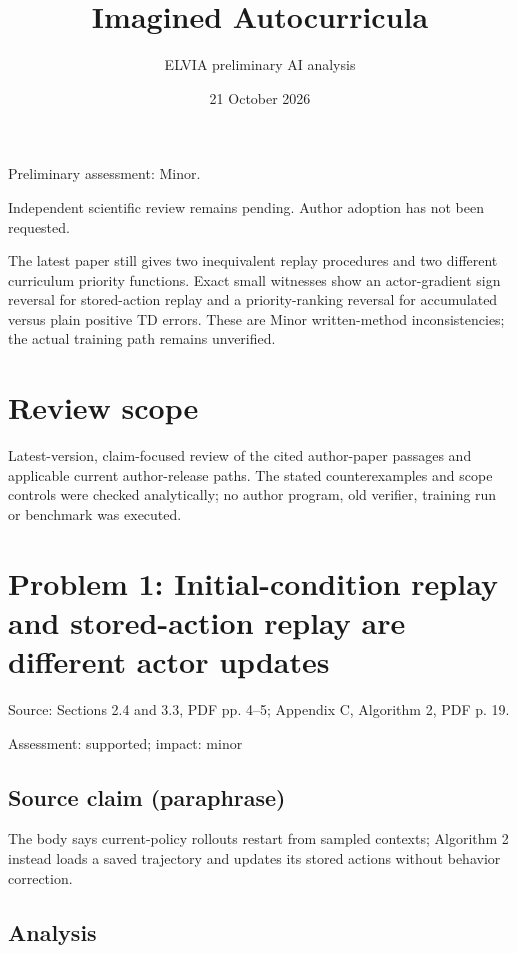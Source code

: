 \documentclass[11pt]{article}
\begin{document}
\title{Imagined Autocurricula}

\author{ELVIA preliminary AI analysis}\date{21 October 2026}\maketitle

Preliminary assessment: Minor.\par

Independent scientific review remains pending. Author adoption has not been requested.

The latest paper still gives two inequivalent replay procedures and two different curriculum priority functions. Exact small witnesses show an actor-gradient sign reversal for stored-action replay and a priority-ranking reversal for accumulated versus plain positive TD errors. These are Minor written-method inconsistencies; the actual training path remains unverified.

\section*{Review scope}

Latest-version, claim-focused review of the cited author-paper passages and applicable current author-release paths. The stated counterexamples and scope controls were checked analytically; no author program, old verifier, training run or benchmark was executed.

\section*{Problem 1: Initial-condition replay and stored-action replay are different actor updates}

Source: Sections 2.4 and 3.3, PDF pp. 4–5; Appendix C, Algorithm 2, PDF p. 19.

Assessment: supported; impact: minor

\subsection*{Source claim (paraphrase)}

The body says current-policy rollouts restart from sampled contexts; Algorithm 2 instead loads a saved trajectory and updates its stored actions without behavior correction.

\subsection*{Analysis}
\end{document}
